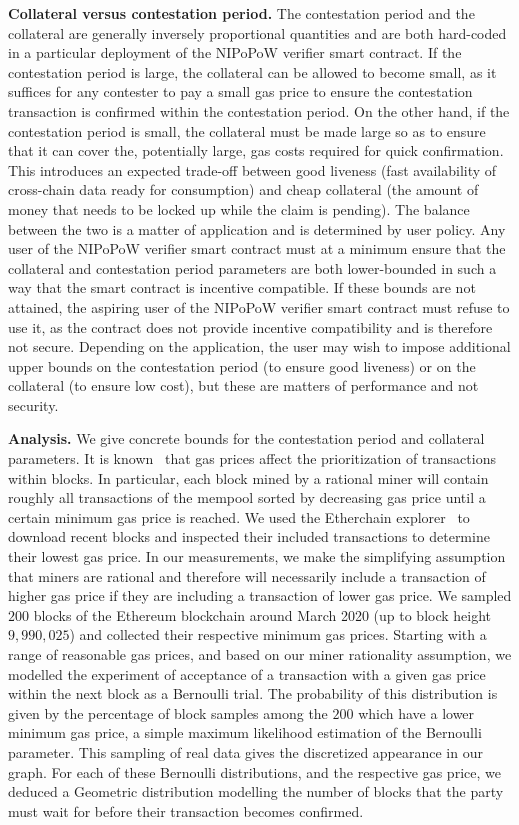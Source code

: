 \noindent \textbf{Collateral versus contestation period.}
The contestation period and the collateral are generally inversely proportional quantities
and are both hard-coded in a particular deployment of the NIPoPoW verifier smart contract.
If the contestation period is large, the collateral can be allowed to become small, as
it suffices for any contester to pay a small gas price to ensure the contestation transaction is
confirmed within the contestation period. On the other hand, if the contestation period is
small, the collateral must be made large so as to ensure that it can cover the,
potentially large, gas costs required for quick confirmation. This introduces an expected trade-off
between good liveness (fast availability of cross-chain data ready for consumption) and
cheap collateral (the amount of money that needs to be locked up while the claim is pending).
The balance between the two is a matter of application and is determined by user policy.
Any user of the NIPoPoW
verifier smart contract must at a minimum ensure that the collateral and contestation
period parameters are both lower-bounded in such a way that the smart contract is incentive compatible.
If these bounds are not attained, the aspiring user of the NIPoPoW verifier smart
contract must refuse to use it, as the contract does not provide incentive compatibility
and is therefore not secure. Depending on the application, the user may wish to impose
additional upper bounds on the contestation period (to ensure good liveness) or on the
collateral (to ensure low cost), but these are matters of performance and not security.

\noindent \textbf{Analysis.} We give concrete bounds for the contestation period and
collateral parameters. It is known~\cite{wood} that gas prices affect the prioritization
of transactions within blocks. In particular, each block mined by a rational miner
will contain roughly all transactions of the mempool sorted by decreasing gas price
until a certain minimum gas price is reached. We used the Etherchain
explorer~\cite{etherchain} to download recent blocks and inspected their included
transactions to determine their lowest gas price. In our measurements, we make the
simplifying assumption that miners are rational and therefore will necessarily include
a transaction of higher gas price if they are including a transaction of lower gas price.
We sampled $200$ blocks of the Ethereum blockchain around March 2020 (up to block height $9{,}990{,}025$) and
collected their respective minimum
gas prices.
Starting with a range of reasonable gas prices, and based on our miner rationality assumption,
we modelled the experiment of acceptance of a transaction
with a given gas price within the next block as a Bernoulli trial.
The probability of this distribution is given by the percentage
of block samples among the $200$ which have a lower minimum gas price,
a simple maximum likelihood estimation of the Bernoulli parameter.
This sampling of real data gives the discretized appearance in our graph.
For each of these Bernoulli distributions, and the respective gas price, we deduced
a Geometric distribution modelling the number of blocks that the party must wait
for before their transaction becomes confirmed.

